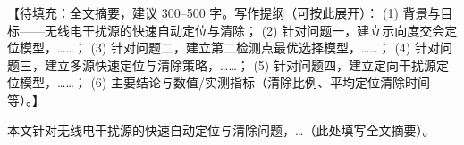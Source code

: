【待填充：全文摘要，建议 300--500 字。写作提纲（可按此展开）：
  (1) 背景与目标——无线电干扰源的快速自动定位与清除；
  (2) 针对问题一，建立示向度交会定位模型，……；
  (3) 针对问题二，建立第二检测点最优选择模型，……；
  (4) 针对问题三，建立多源快速定位与清除策略，……；
  (5) 针对问题四，建立定向干扰源定位模型，……；
  (6) 主要结论与数值/实测指标（清除比例、平均定位清除时间等）。】

本文针对无线电干扰源的快速自动定位与清除问题，\ldots{}（此处填写全文摘要）。

